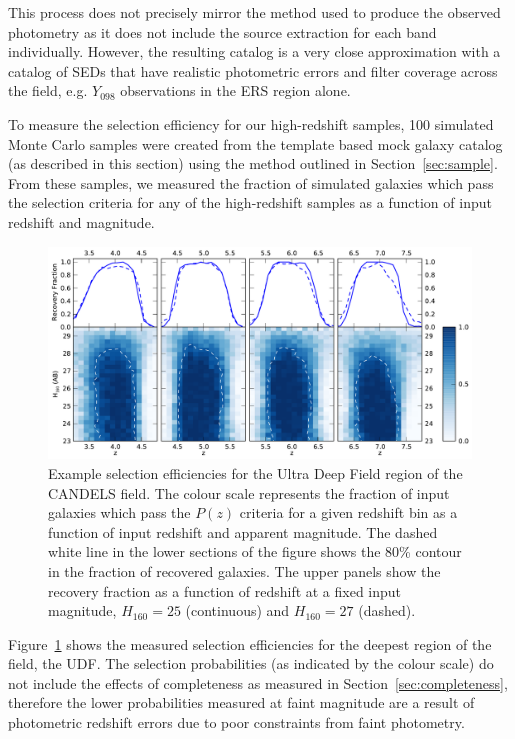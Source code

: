 This process does not precisely mirror the method used to produce the observed photometry as it does not include the source extraction for each band individually. However, the resulting catalog is a very close approximation with a catalog of SEDs that have realistic photometric errors and filter coverage across the field, e.g. $Y_{098}$ observations in the ERS region alone. 

To measure the selection efficiency for our high-redshift samples, 100 simulated Monte Carlo samples were created from the template based mock galaxy catalog (as described in this section) using the method outlined in Section~\ref{sec:sample}. From these samples, we measured the fraction of simulated galaxies which pass the selection criteria for any of the high-redshift samples as a function of input redshift and magnitude.

\begin{figure}
\centering
\includegraphics[width=\textwidth]{plots/fig4.pdf}
\caption[Example selection efficiencies for the Ultra Deep Field region of the CANDELS field.]{Example selection efficiencies for the Ultra Deep Field region of the CANDELS field. The colour scale represents the fraction of input galaxies which pass the $P(z)$ criteria for a given redshift bin as a function of input redshift and apparent magnitude. The dashed white line in the lower sections of the figure shows the 80\% contour in the fraction of recovered galaxies. The upper panels show the recovery fraction as a function of redshift at a fixed input magnitude, $H_{160} = 25$ (continuous) and $H_{160} = 27$ (dashed).}
\label{fig:selection}
\end{figure}

Figure~\ref{fig:selection} shows the measured selection efficiencies for  the deepest region of the field, the UDF. The selection probabilities (as indicated by the colour scale) do not include the effects of completeness as measured in Section~\ref{sec:completeness}, therefore the lower probabilities measured at faint magnitude are a result of photometric redshift errors due to poor constraints from faint photometry.

